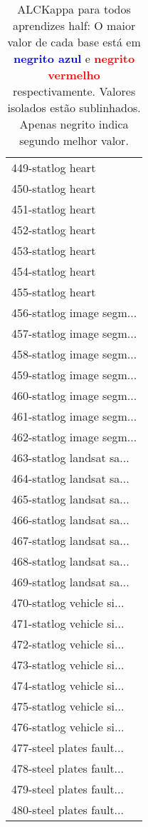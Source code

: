 \begin{table}[h]
\caption{ALCKappa para todos aprendizes half: O maior valor de cada base está em \textcolor{blue}{\textbf{negrito azul}} e \textcolor{red}{\textbf{negrito vermelho}} respectivamente. Valores isolados estão sublinhados. Apenas negrito indica segundo melhor valor.}
\begin{center}\begin{tabular}{l}
 & \\ \hline 449-statlog heart &  \\
450-statlog heart &  \\
451-statlog heart &  \\
452-statlog heart &  \\
453-statlog heart &  \\
454-statlog heart &  \\
455-statlog heart &  \\ \hline
456-statlog image segm... &  \\
457-statlog image segm... &  \\
458-statlog image segm... &  \\
459-statlog image segm... &  \\
460-statlog image segm... &  \\
461-statlog image segm... &  \\
462-statlog image segm... &  \\ \hline
463-statlog landsat sa... &  \\
464-statlog landsat sa... &  \\
465-statlog landsat sa... &  \\
466-statlog landsat sa... &  \\
467-statlog landsat sa... &  \\
468-statlog landsat sa... &  \\
469-statlog landsat sa... &  \\ \hline
470-statlog vehicle si... &  \\
471-statlog vehicle si... &  \\
472-statlog vehicle si... &  \\
473-statlog vehicle si... &  \\
474-statlog vehicle si... &  \\
475-statlog vehicle si... &  \\
476-statlog vehicle si... &  \\ \hline
477-steel plates fault... &  \\
478-steel plates fault... &  \\
479-steel plates fault... &  \\
480-steel plates fault... &  \\\end{tabular}\label{stratsALCKappa14AllReduxHalfb}
\end{center}
\end{table}
